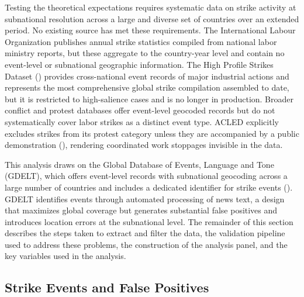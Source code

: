 \documentclass[
  11pt,
]{article}
\begin{document}
Testing the theoretical expectations requires systematic data on strike
activity at subnational resolution across a large and diverse set of
countries over an extended period. No existing source has met these
requirements. The International Labour Organization publishes annual
strike statistics compiled from national labor ministry reports, but
these aggregate to the country-year level and contain no event-level or
subnational geographic information. The High Profile Strikes Dataset
() provides
cross-national event records of major industrial actions and represents
the most comprehensive global strike compilation assembled to date, but
it is restricted to high-salience cases and is no longer in production.
Broader conflict and protest databases offer event-level geocoded
records but do not systematically cover labor strikes as a distinct
event type. ACLED explicitly excludes strikes from its protest category
unless they are accompanied by a public demonstration
(), rendering coordinated
work stoppages invisible in the data.

This analysis draws on the Global Database of Events, Language and Tone
(GDELT), which offers event-level records with subnational geocoding
across a large number of countries and includes a dedicated identifier
for strike events (). GDELT identifies events through automated processing of news
text, a design that maximizes global coverage but generates substantial
false positives and introduces location errors at the subnational level.
The remainder of this section describes the steps taken to extract and
filter the data, the validation pipeline used to address these problems,
the construction of the analysis panel, and the key variables used in
the analysis.

\subsection{Strike Events and False
Positives}\label{strike-events-and-false-positives}
\end{document}

